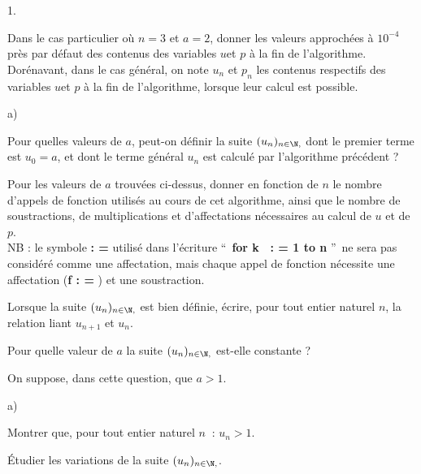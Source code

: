 \documentclass[11pt]{article}%
\begin{document}
\begin{noliste}{1.}
 \setlength{\itemsep}{4mm}
\item Dans le cas particulier où $n = 3$ et $a = 2$, donner les valeurs
approchées à $10^{-4}$ près par défaut des contenus des variables $u$et
$p$ à la fin
de l'algorithme.\\
Dorénavant, dans le cas général, on note $u_{n}$ et $p_{n}$ les
contenus
respectifs des variables $u$et $p$ à la fin de l'algorithme, lorsque
leur
calcul est possible.

\item 

\begin{noliste}{a)}
 \setlength{\itemsep}{2mm}
\item Pour quelles valeurs de $a$, peut-on définir la suite
$(u_{n})_{n\in 
\N,}$ dont le premier terme est $u_{0} = a$, et dont le terme général
$u_{n}$ est calculé par l'algorithme précédent ?

\item Pour les valeurs de $a$ trouvées ci-dessus, donner en fonction de
$n$
le nombre d'appels de fonction utilisés au cours de cet algorithme,
ainsi
que le nombre de soustractions, de multiplications et d'affectations
nécessaires au calcul de $u$ et de $p$.\\
NB : le symbole \textbf{ : = } utilisé dans l'écriture
\textquotedblleft\ 
\textbf{for k\textit{\ } : = 1 to n} \textquotedblright\ ne sera pas
considéré
comme une affectation, mais chaque appel de fonction nécessite une
affectation (\textbf{f : = }) et une soustraction.
\end{noliste}

\item Lorsque la suite $(u_{n})_{n\in \N,}$ est bien définie, écrire,
pour tout entier naturel $n$, la relation liant $u_{n + 1}$ et $u_{n}$.

\item Pour quelle valeur de $a$ la suite $(u_{n})_{n\in \N,}$
est-elle constante ?

\item On suppose, dans cette question, que $a>1$.

\begin{noliste}{a)}
 \setlength{\itemsep}{2mm}
\item Montrer que, pour tout entier naturel $n\ $ : $u_{n}>1$.

\item Étudier les variations de la suite $(u_{n})_{n\in \N,}$.


\end{noliste}
\end{noliste}
\end{document}
